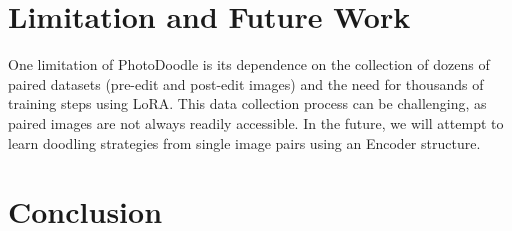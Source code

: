 


\section{Limitation and Future Work}

One limitation of PhotoDoodle is its dependence on the collection of dozens of paired datasets (pre-edit and post-edit images) and the need for thousands of training steps using LoRA. This data collection process can be challenging, as paired images are not always readily accessible. In the future, we will attempt to learn doodling strategies from single image pairs using an Encoder structure.



\section{Conclusion}

